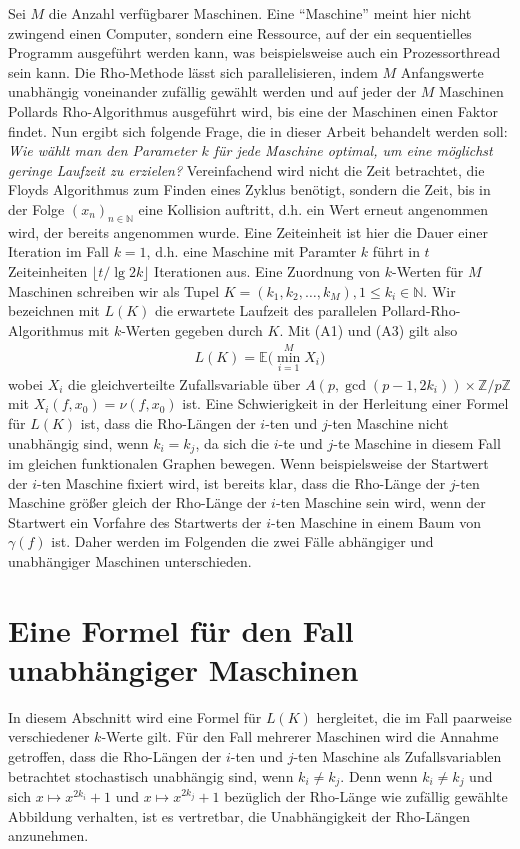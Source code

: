 \documentclass[a4paper, 10pt, ngerman]{article}
\newcommand{\N}{\mathbb{N}}
\newcommand{\Z}{\mathbb{Z}}
\newcommand{\E}{\mathbb{E}}
\begin{document}
Sei $M$ die Anzahl verfügbarer Maschinen. Eine "`Maschine"'  meint hier nicht zwingend einen Computer, sondern eine Ressource, auf der ein sequentielles Programm ausgeführt werden kann, was beispielsweise auch ein Prozessorthread sein kann. Die Rho-Methode lässt sich parallelisieren, indem $M$ Anfangswerte unabhängig voneinander zufällig gewählt werden und auf jeder der $M$ Maschinen Pollards Rho-Algorithmus ausgeführt wird, bis eine der Maschinen einen Faktor findet. Nun ergibt sich folgende Frage, die in dieser Arbeit behandelt werden soll: \emph{Wie wählt man den Parameter $k$ für jede Maschine optimal, um eine möglichst geringe Laufzeit zu erzielen?} Vereinfachend wird nicht die Zeit betrachtet, die Floyds Algorithmus zum Finden eines Zyklus benötigt, sondern die Zeit, bis in der Folge $(x_n)_{n \in \N}$ eine Kollision auftritt, d.h. ein Wert erneut angenommen wird, der bereits angenommen wurde. Eine Zeiteinheit ist hier die Dauer einer Iteration im Fall $k = 1$, d.h. eine Maschine mit Paramter $k$ führt in $t$ Zeiteinheiten $\lfloor t / \lg 2k \rfloor$ Iterationen aus. Eine Zuordnung von $k$-Werten für $M$ Maschinen schreiben wir als Tupel $K = (k_1, k_2, \dots, k_M), 1 \le k_i \in \N$.  Wir bezeichnen mit $L(K)$ die erwartete Laufzeit des parallelen Pollard-Rho-Algorithmus mit $k$-Werten gegeben durch $K$. Mit (A1) und (A3) gilt also
\begin{align*}
    L(K) = \E \bigg ( \min_{i = 1}^M X_i \bigg )
\end{align*}
wobei $X_i$ die gleichverteilte Zufallsvariable über $A(p, \gcd(p - 1, 2k_i)) \times \Z/p\Z$ mit $X_i(f, x_0) = \nu(f, x_0)$ ist. Eine Schwierigkeit in der Herleitung einer Formel für $L(K)$ ist, dass die Rho-Längen der $i$-ten und $j$-ten Maschine nicht unabhängig sind, wenn $k_i = k_j$, da sich die $i$-te und $j$-te Maschine in diesem Fall im gleichen funktionalen Graphen bewegen. Wenn beispielsweise der Startwert der $i$-ten Maschine fixiert wird, ist bereits klar, dass die Rho-Länge der $j$-ten Maschine größer gleich der Rho-Länge der $i$-ten Maschine sein wird, wenn der Startwert ein Vorfahre des Startwerts der $i$-ten Maschine in einem Baum von $\gamma(f)$ ist. Daher werden im Folgenden die zwei Fälle abhängiger und unabhängiger Maschinen unterschieden.

\section{Eine Formel für den Fall unabhängiger Maschinen}

In diesem Abschnitt wird eine Formel für $L(K)$ hergleitet, die im Fall paarweise verschiedener $k$-Werte gilt. Für den Fall mehrerer Maschinen wird die Annahme getroffen, dass die Rho-Längen der $i$-ten und $j$-ten Maschine als Zufallsvariablen betrachtet stochastisch unabhängig sind, wenn $k_i \ne k_j$. Denn wenn $k_i \ne k_j$ und sich $x \mapsto x^{2k_i} + 1$ und $x \mapsto x^{2k_j} + 1$ bezüglich der Rho-Länge wie zufällig gewählte Abbildung verhalten, ist es vertretbar, die Unabhängigkeit der Rho-Längen anzunehmen.
\end{document}
